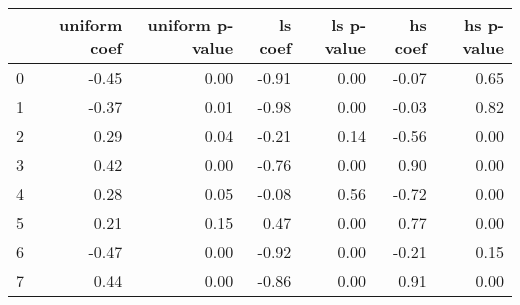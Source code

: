 \begin{tabular}{lrrrrrr}
\toprule
 & uniform coef & uniform p-value & ls coef & ls p-value & hs coef & hs p-value \\
\midrule
0 & -0.45 & 0.00 & -0.91 & 0.00 & -0.07 & 0.65 \\
1 & -0.37 & 0.01 & -0.98 & 0.00 & -0.03 & 0.82 \\
2 & 0.29 & 0.04 & -0.21 & 0.14 & -0.56 & 0.00 \\
3 & 0.42 & 0.00 & -0.76 & 0.00 & 0.90 & 0.00 \\
4 & 0.28 & 0.05 & -0.08 & 0.56 & -0.72 & 0.00 \\
5 & 0.21 & 0.15 & 0.47 & 0.00 & 0.77 & 0.00 \\
6 & -0.47 & 0.00 & -0.92 & 0.00 & -0.21 & 0.15 \\
7 & 0.44 & 0.00 & -0.86 & 0.00 & 0.91 & 0.00 \\
\bottomrule
\end{tabular}
